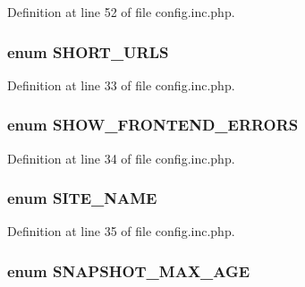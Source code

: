 Definition at line 52 of file config.inc.php.

\hypertarget{config_8inc_8php_a377ac3321785e25215435e8d9802bc34}{
\subsubsection[{SHORT\_\-URLS}]{\setlength{\rightskip}{0pt plus 5cm}enum {\bf SHORT\_\-URLS}}}
\label{config_8inc_8php_a377ac3321785e25215435e8d9802bc34}


Definition at line 33 of file config.inc.php.

\hypertarget{config_8inc_8php_a71022f94adb600e3984795805fe7f8d0}{
\subsubsection[{SHOW\_\-FRONTEND\_\-ERRORS}]{\setlength{\rightskip}{0pt plus 5cm}enum {\bf SHOW\_\-FRONTEND\_\-ERRORS}}}
\label{config_8inc_8php_a71022f94adb600e3984795805fe7f8d0}


Definition at line 34 of file config.inc.php.

\hypertarget{config_8inc_8php_a38f8e1265350d7091b55f4cffe629f3a}{
\subsubsection[{SITE\_\-NAME}]{\setlength{\rightskip}{0pt plus 5cm}enum {\bf SITE\_\-NAME}}}
\label{config_8inc_8php_a38f8e1265350d7091b55f4cffe629f3a}


Definition at line 35 of file config.inc.php.

\hypertarget{config_8inc_8php_aa9c8d739795b1000f6ea105992a4e488}{
\subsubsection[{SNAPSHOT\_\-MAX\_\-AGE}]{\setlength{\rightskip}{0pt plus 5cm}enum {\bf SNAPSHOT\_\-MAX\_\-AGE}}}
\label{config_8inc_8php_aa9c8d739795b1000f6ea105992a4e488}


